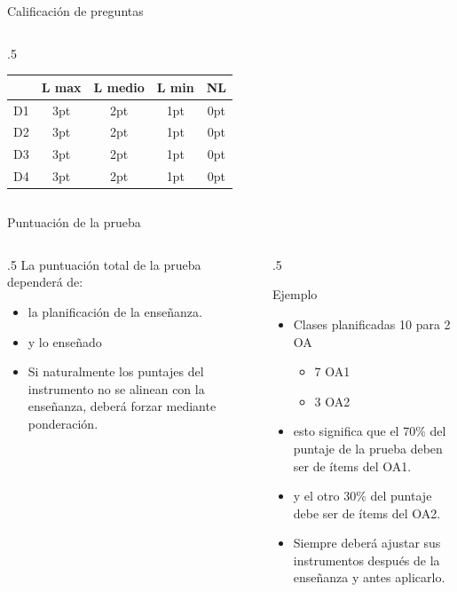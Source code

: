 \documentclass[11pt, aspectratio=169, xcolor=table,hyphens]{beamer}
\begin{document}
\begin{frame}{Calificación de preguntas}
\begin{columns}
\begin{column}{.5\linewidth}
{				\begin{tabular}{|c|c|c|c|c|}
					\hline
					   & L max & L medio & L min & NL  \\
					\hline
					D1 & 3pt   & 2pt     & 1pt   & 0pt \\
					\hline
					D2 & 3pt   & 2pt     & 1pt   & 0pt \\
					\hline
					D3 & 3pt   & 2pt     & 1pt   & 0pt \\
					\hline
					D4 & 3pt   & 2pt     & 1pt   & 0pt \\
					\hline
				\end{tabular}
			}
		\end{column}
	\end{columns}
\end{frame}

\begin{frame}{Puntuación de la prueba}
	\begin{columns}
		\begin{column}{.5\linewidth}
			La puntuación total de la prueba dependerá de:
			\begin{itemize}[<+->]
				\item la planificación de la enseñanza.
				\item y lo enseñado
				\item<9->[OJO] Si naturalmente los puntajes del instrumento no se alinean con la enseñanza, deberá forzar mediante ponderación.
			\end{itemize}
		\end{column}
		\begin{column}{.5\linewidth}
			\begin{exampleblock}{Ejemplo}
				\begin{itemize}[<+->]
					\item Clases planificadas 10 para 2 OA
					      \begin{itemize}
						      \item 7 OA1
						      \item 3 OA2
					      \end{itemize}
					\item esto significa que el 70\% del puntaje de la prueba deben ser de ítems del OA1.
					\item y el otro 30\% del puntaje debe ser de ítems del OA2.
					\item[\checkmark] Siempre deberá ajustar sus instrumentos después de la enseñanza y antes aplicarlo.
				\end{itemize}
			\end{exampleblock}
		\end{column}
	\end{columns}
\end{frame}
\end{document}
